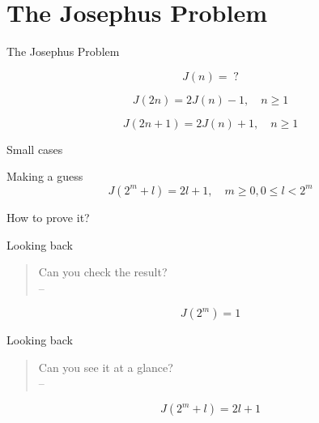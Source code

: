 \section{The Josephus Problem}

\begin{frame}{The Josephus Problem}

  \[
    J(n) = \; ?
  \]
\end{frame}

\begin{frame}{}
  \[
    J(2n) = 2 J(n) - 1, \quad n \geq 1
  \]
\end{frame}

\begin{frame}{}
  \[
    J(2n + 1) = 2 J(n) + 1, \quad n \geq 1
  \]
\end{frame}

\begin{frame}{Small cases}
\end{frame}

\begin{frame}{Making a guess}
  \[
    J(2^m + l) = 2l + 1, \quad m \geq 0, 0 \leq l < 2^m
  \]

  \vspace{0.60cm}
  \centerline{How to prove it?}
\end{frame}

\begin{frame}{Looking back}
  \begin{quote}
    \begin{center}
      Can you check the result? \\
      \hspace{3.0cm} -- \GP{}
    \end{center}
  \end{quote}

  \[
    J(2^m) = 1
  \]
\end{frame}

\begin{frame}{Looking back}
  \begin{quote}
    \begin{center}
      Can you see it at a glance? \\
      \hspace{3.0cm} -- \GP{}
    \end{center}
  \end{quote}

  \[
    J(2^m + l) = 2l + 1
  \]
\end{frame}


